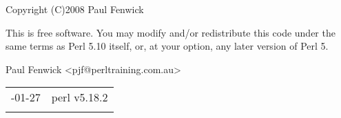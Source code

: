 \documentclass[]{article}
\begin{document}

Copyright (C)2008 Paul Fenwick

This is free software. You may modify and/or redistribute this code
under the same terms as Perl 5.10 itself, or, at your option, any later
version of Perl 5.


Paul Fenwick \textless{}pjf@perltraining.com.au\textgreater{}

\begin{longtable}[c]{@{}ll@{}}
\toprule\addlinespace
2014-01-27 & perl v5.18.2
\\\addlinespace
\bottomrule
\end{longtable}
\end{document}
